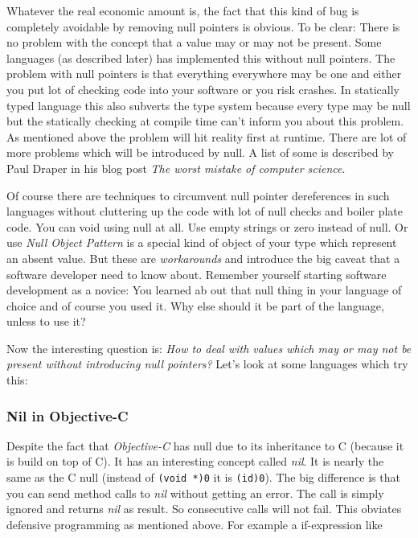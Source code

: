 \documentclass[a4paper,12pt]{report}
\begin{document}
Whatever the real economic amount is, the fact that this kind of bug is completely avoidable by removing null pointers is obvious. To be clear: There is no problem with the concept that a value may or may not be present. Some languages (as described later) has implemented this without null pointers. The problem with null pointers is that everything everywhere may be one and either you put lot of checking code into your software or you risk crashes. In statically typed language this also subverts the type system because every type may be null but the statically checking at compile time can't inform you about this problem. As mentioned above the problem will hit reality first at runtime. There are lot of more problems which will be introduced by null. A list of some is described by Paul Draper in his blog post \textit{The worst mistake of computer science}\cite{draper-worst-mistake-cs}.

Of course there are techniques to circumvent null pointer dereferences in such languages without cluttering up the code with lot of null checks and boiler plate code. You can void using null at all. Use empty strings or zero instead of null. Or use \textit{Null Object Pattern} is a special kind of object of your type which represent an absent value. But these are \textit{workarounds} and introduce the big caveat that a software developer need to know about. Remember yourself starting software development as a novice: You learned ab out that null thing in your language of choice and of course you used it. Why else should it be part of the language, unless to use it?

Now the interesting question is: \textit{How to deal with values which may or may not be present without introducing null pointers?} Let's look at some languages which try this:

\subsubsection{Nil in Objective-C}
Despite the fact that \textit{Objective-C} has null due to its inheritance to C (because it is build on top of C). It has an interesting concept called \textit{nil}. It is nearly the same as the C null (instead of \verb|(void *)0| it is \verb|(id)0|). The big difference is that you can send method calls to \textit{nil} without getting an error. The call is simply ignored and returns \textit{nil} as result. So consecutive calls will not fail. This obviates defensive programming as mentioned above. For example a if-expression like
\end{document}
